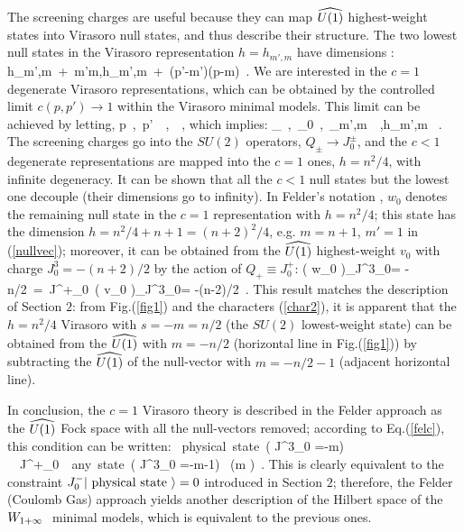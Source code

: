 The screening charges are useful because they can map $\u1$ 
highest-weight states into Virasoro null states, and thus
describe their structure. The two lowest null states in the 
Virasoro representation $h=h_{m',m}$ have dimensions \cite{cft}:
\beq
h_{m',m}\ +\ m'm\quad ,\quad h_{m',m}\ +\ (p'-m')(p-m)\ .
\label{nullvec}\eeq
We are interested in the $c=1$ degenerate Virasoro representations,
which can be obtained by the controlled limit
$c(p,p')\to 1$ within the Virasoro minimal models.
This limit can be achieved by letting,
\beq
p\ ,\ p'\ \to\infty\ ,\qquad {}\ \ ,
\eeq
which implies:
\beq
\a_{\pm}\ ,\ \a_0\ ,\ \a_{m',m}\to {}\ 
\equiv {}\ ,\quad h_{m',m} \to {}\ .
\eeq
The screening charges go into the $SU(2)$ operators, $Q_{\pm} \to
J^{\pm}_0$, and the $c<1$ degenerate representations are mapped
into the $c=1$ ones, $h = n^2/4$, with infinite
degeneracy.
It can be shown that all the $c<1$ null states but the lowest one
decouple (their dimensions go to infinity). 
In Felder's notation \cite{felder}, $w_0$ denotes the 
remaining null state in the $c=1$ representation with $h=n^2/4$;
this state has the dimension
$h=n^2/4 +n+1 = (n+2)^2/4$, e.g. $m=n+1$, $m'=1$ in (\ref{nullvec}); 
moreover, it can be obtained from the
$\u1$ highest-weight $v_0$ with charge $J^3_0 = -(n+2)/2$ by the 
action of $Q_+ \equiv J^+_0$:
\beq
\left( w_0 \right)_{J^3_0= -n/2}\ =\ J^+_0\ 
\left( v_0 \right)_{J^3_0= -(n-2)/2}\ .
\label{felc}
\eeq
This result matches the description of Section $2$: from Fig.(\ref{fig1})
and the characters (\ref{char2}), it is apparent that the $h=n^2/4$
Virasoro \rep with $s= -m=n/2$ (the $SU(2)$ lowest-weight state) 
can be obtained from the $\u1$ \rep
with $m=-n/2$ (horizontal line in Fig.(\ref{fig1})) by subtracting
the $\u1$ \rep of the null-vector with $m=-n/2 -1$ (adjacent horizontal line). 

In conclusion, the $c=1$ Virasoro theory is described in the Felder
approach \cite{felder} as the $\u1$ Fock space with all the 
null-vectors removed;
according to Eq.(\ref{felc}), this condition can be written: 
\beq
\left\vert\ {\rm physical\ state}\ 
\left( J^3_0 =-m\right) \right\rangle\ \neq\ 
J^+_0\ \left\vert\ {\rm any\ state}\ 
\left( J^3_0 =-m-1\right) \right\rangle\  
\qquad (m )\ .
\eeq
This is clearly equivalent to the constraint 
$J^-_0 \vert\ {\rm physical\ state}\ \rangle =0$ introduced in
Section $2$;
therefore, the Felder (Coulomb Gas) approach yields another 
description of the Hilbert space of the $W_{1+\infty}\ $ minimal models, 
which is equivalent to the previous ones.

